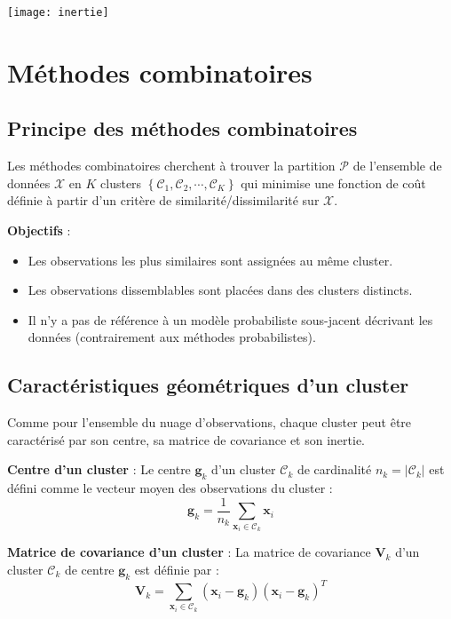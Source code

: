 \documentclass[10pt,a4paper]{article}
\begin{document}

\texttt{[image: inertie]}

\section*{Méthodes combinatoires}

\subsection*{Principe des méthodes combinatoires}

Les méthodes combinatoires cherchent à trouver la partition $\mathcal{P}$ de l'ensemble de données $\mathcal{X}$ en $K$ clusters $\left\{\mathcal{C}_{1}, \mathcal{C}_{2}, \cdots, \mathcal{C}_{K}\right\}$ qui minimise une fonction de coût définie à partir d'un critère de similarité/dissimilarité sur $\mathcal{X}$.

\textbf{Objectifs} :
\begin{itemize}
    \item Les observations les plus similaires sont assignées au même cluster.
    \item Les observations dissemblables sont placées dans des clusters distincts.
    \item Il n'y a pas de référence à un modèle probabiliste sous-jacent décrivant les données (contrairement aux méthodes probabilistes).
\end{itemize}

\subsection*{Caractéristiques géométriques d'un cluster}

Comme pour l'ensemble du nuage d'observations, chaque cluster peut être caractérisé par son centre, sa matrice de covariance et son inertie.

\textbf{Centre d'un cluster} :
Le centre $\mathbf{g}_k$ d'un cluster $\mathcal{C}_k$ de cardinalité $n_k = |\mathcal{C}_k|$ est défini comme le vecteur moyen des observations du cluster :
$$\mathbf{g}_k = \frac{1}{n_k} \sum_{\mathbf{x}_i \in \mathcal{C}_k} \mathbf{x}_i$$

\textbf{Matrice de covariance d'un cluster} :
La matrice de covariance $\mathbf{V}_k$ d'un cluster $\mathcal{C}_k$ de centre $\mathbf{g}_k$ est définie par :
$$\mathbf{V}_k = \sum_{\mathbf{x}_i \in \mathcal{C}_k} (\mathbf{x}_i - \mathbf{g}_k)(\mathbf{x}_i - \mathbf{g}_k)^T$$
\end{document}
